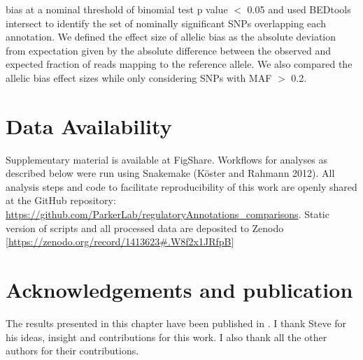 bias at a nominal threshold of binomial test p value $<$ 0.05 and used BEDtools intersect to identify the set of nominally significant SNPs overlapping each annotation. We defined the effect size of allelic bias as the absolute deviation from expectation given by the absolute difference between the observed and expected fraction of reads mapping to the reference allele. We also compared the allelic bias effect sizes while only considering SNPs with MAF $>$ 0.2.

\section{Data Availability}
Supplementary material is available at FigShare. Workflows for analyses as described below were run using Snakemake (Köster and Rahmann 2012). All analysis steps and code to facilitate reproducibility of this work are openly shared at the GitHub repository:  \url{https://github.com/ParkerLab/regulatoryAnnotations_comparisons}. Static version of scripts and all processed data are deposited to Zenodo [\url{https://zenodo.org/record/1413623#.W8f2x1JRfpB}]


\section{Acknowledgements and publication}
The results presented in this chapter have been published in \cite{varshneyCellSpecificityHuman2018}. I thank Steve for his ideas, insight and contributions for this work. I also thank all the other authors for their contributions.




